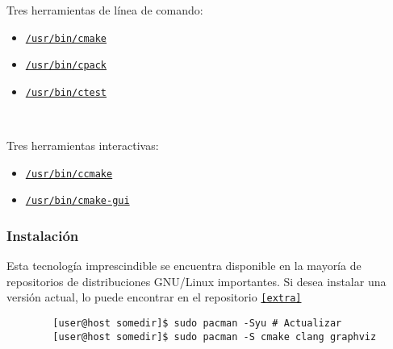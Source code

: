 \begin{frame}[fragile]
	Tres herramientas de línea de comando:

	\begin{itemize}
		\item
		
		\href{https://man.archlinux.org/man/cmake.1}{\lstinline{/usr/bin/cmake}}

		\item
		
		\href{https://man.archlinux.org/man/cpack.1}{\lstinline{/usr/bin/cpack}}

		\item
		
		\href{https://man.archlinux.org/man/ctest.1}{\lstinline{/usr/bin/ctest}}
	\end{itemize}

	\

	Tres herramientas interactivas:

	\begin{itemize}
		\item
		
		\href{https://man.archlinux.org/man/ccmake.1}{\lstinline{/usr/bin/ccmake}}

		\item
		
		\href{https://man.archlinux.org/man/cmake-gui.1}{\lstinline{/usr/bin/cmake-gui}}
	\end{itemize}
\end{frame}

\begin{frame}[fragile]
	\frametitle{Instalación}
	Esta tecnología imprescindible se encuentra disponible en la
	mayoría de repositorios de distribuciones GNU/Linux importantes.
	Si desea instalar una versión actual, lo puede encontrar en el
	repositorio \href{https://archlinux.org/packages/extra/x86_64/cmake}{\lstinline{[extra]}}

	\begin{verbatim}
		[user@host somedir]$ sudo pacman -Syu # Actualizar
		[user@host somedir]$ sudo pacman -S cmake clang graphviz
	\end{verbatim}
\end{frame}


